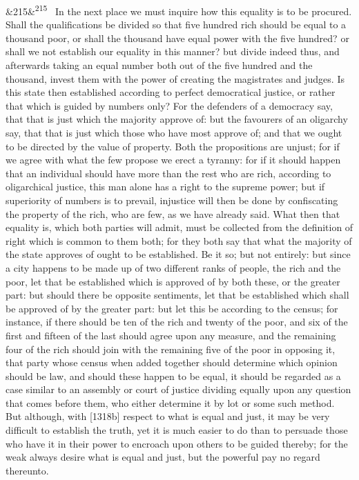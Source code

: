 \documentclass[12pt]{article}
\newcommand{\para}[1][]{\par\noindent\ifx&#1&\else\textsuperscript{\footnotesize #1}~\fi}
\begin{document}
\para[215] In the next place we must inquire how this equality is to be procured. Shall the qualifications be divided so that five hundred rich should be equal to a thousand poor, or shall the thousand have equal power with the five hundred? or shall we not establish our equality in this manner? but divide indeed thus, and afterwards taking an equal number both out of the five hundred and the thousand, invest them with the power of creating the magistrates and judges. Is this state then established according to perfect democratical justice, or rather that which is guided by numbers only? For the defenders of a democracy say, that that is just which the majority approve of: but the favourers of an oligarchy say, that that is just which those who have most approve of; and that we ought to be directed by the value of property. Both the propositions are unjust; for if we agree with what the few propose we erect a tyranny: for if it should happen that an individual should have more than the rest who are rich, according to oligarchical justice, this man alone has a right to the supreme power; but if superiority of numbers is to prevail, injustice will then be done by confiscating the property of the rich, who are few, as we have already said. What then that equality is, which both parties will admit, must be collected from the definition of right which is common to them both; for they both say that what the majority of the state approves of ought to be established. Be it so; but not entirely: but since a city happens to be made up of two different ranks of people, the rich and the poor, let that be established which is approved of by both these, or the greater part: but should there be opposite sentiments, let that be established which shall be approved of by the greater part: but let this be according to the census; for instance, if there should be ten of the rich and twenty of the poor, and six of the first and fifteen of the last should agree upon any measure, and the remaining four of the rich should join with the remaining five of the poor in opposing it, that party whose census when added together should determine which opinion should be law, and should these happen to be equal, it should be regarded as a case similar to an assembly or court of justice dividing equally upon any question that comes before them, who either determine it by lot or some such method. But although, with [1318b] respect to what is equal and just, it may be very difficult to establish the truth, yet it is much easier to do than to persuade those who have it in their power to encroach upon others to be guided thereby; for the weak always desire what is equal and just, but the powerful pay no regard thereunto.
\end{document}
